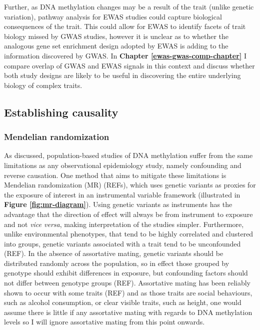 \documentclass[11pt,twoside]{bristolthesis}
\begin{document}
Further, as DNA methylation changes may be a result of the trait (unlike genetic variation), pathway analysis for EWAS studies could capture biological consequences of the trait. This could allow for EWAS to identify facets of trait biology missed by GWAS studies, however it is unclear as to whether the analogous gene set enrichment design adopted by EWAS is adding to the information discovered by GWAS. In \textbf{Chapter \ref{ewas-gwas-comp-chapter}} I compare overlap of GWAS and EWAS signals in this context and discuss whether both study designs are likely to be useful in discovering the entire underlying biology of complex traits.

\hypertarget{establishing-causality}{%
\subsection{Establishing causality}\label{establishing-causality}}

\hypertarget{mendelian-randomization}{%
\subsubsection{Mendelian randomization}\label{mendelian-randomization}}

As discussed, population-based studies of DNA methylation suffer from the same limitations as any observational epidemiology study, namely confounding and reverse causation. One method that aims to mitigate these limitations is Mendelian randomization (MR) (REFs), which uses genetic variants as proxies for the exposure of interest in an instrumental variable framework (illustrated in \textbf{Figure \ref{fig:mr-diagram}}). Using genetic variants as instruments has the advantage that the direction of effect will always be from instrument to exposure and not \emph{vice versa}, making interpretation of the studies simpler. Furthermore, unlike environmental phenotypes, that tend to be highly correlated and clustered into groups, genetic variants associated with a trait tend to be unconfounded (REF). In the absence of assortative mating, genetic variants should be distributed randomly across the population, so in effect those grouped by genotype should exhibit differences in exposure, but confounding factors should not differ between genotype groups (REF). Assortative mating has been reliably shown to occur with some traits (REF) and as those traits are social behaviours, such as alcohol consumption, or clear visible traits, such as height, one would assume there is little if any assortative mating with regards to DNA methylation levels so I will ignore assortative mating from this point onwards.
\end{document}
